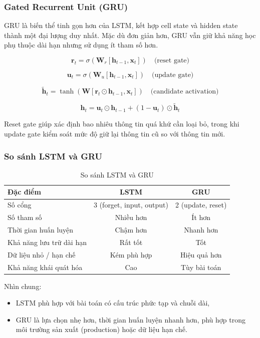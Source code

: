 \subsubsection{Gated Recurrent Unit (GRU)}


GRU là biến thể tinh gọn hơn của LSTM, kết hợp cell state và hidden state thành một đại lượng duy nhất. Mặc dù đơn giản hơn, GRU vẫn giữ khả năng học phụ thuộc dài hạn nhưng sử dụng ít tham số hơn.

\[
\mathbf{r}_t = \sigma(\mathbf{W}_r[\mathbf{h}_{t-1}, \mathbf{x}_t]) \quad \text{(reset gate)}
\]

\[
\mathbf{u}_t = \sigma(\mathbf{W}_u[\mathbf{h}_{t-1}, \mathbf{x}_t]) \quad \text{(update gate)}
\]

\[
\tilde{\mathbf{h}}_t = \tanh(\mathbf{W}[\mathbf{r}_t \odot \mathbf{h}_{t-1}, \mathbf{x}_t]) \quad \text{(candidate activation)}
\]

\[
\mathbf{h}_t = \mathbf{u}_t \odot \mathbf{h}_{t-1} + (1 - \mathbf{u}_t) \odot \tilde{\mathbf{h}}_t
\]

Reset gate giúp xác định bao nhiêu thông tin quá khứ cần loại bỏ, trong khi update gate kiểm soát mức độ giữ lại thông tin cũ so với thông tin mới.

\subsubsection{So sánh LSTM và GRU}

\begin{table}[h]
\centering
\caption{So sánh LSTM và GRU}
\begin{tabular}{|l|c|c|}
\hline
\textbf{Đặc điểm} & \textbf{LSTM} & \textbf{GRU} \\ \hline
Số cổng & 3 (forget, input, output) & 2 (update, reset) \\ \hline
Số tham số & Nhiều hơn & Ít hơn \\ \hline
Thời gian huấn luyện & Chậm hơn & Nhanh hơn \\ \hline
Khả năng lưu trữ dài hạn & Rất tốt & Tốt \\ \hline
Dữ liệu nhỏ / hạn chế & Kém phù hợp & Hiệu quả hơn \\ \hline
Khả năng khái quát hóa & Cao & Tùy bài toán \\ \hline
\end{tabular}
\label{tab:lstm_vs_gru}
\end{table}

Nhìn chung:
\begin{itemize}
    \item LSTM phù hợp với bài toán có cấu trúc phức tạp và chuỗi dài,
    \item GRU là lựa chọn nhẹ hơn, thời gian huấn luyện nhanh hơn, phù hợp trong môi trường sản xuất (production) hoặc dữ liệu hạn chế.
\end{itemize}

